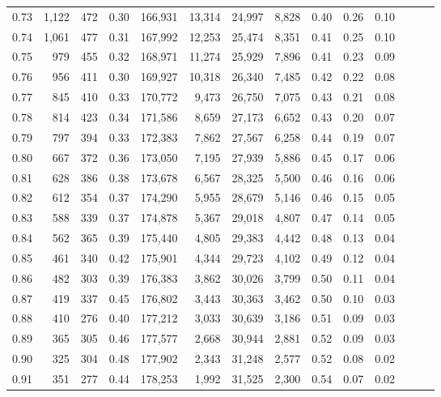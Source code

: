 \begin{tabular}{rrrrrrrrrrrrrr}
0.73 &  1,122 &  472 &  0.30 &  166,931 &   13,314 &  24,997 &   8,828 &  0.40 &  0.26 &      0.10 \\
0.74 &  1,061 &  477 &  0.31 &  167,992 &   12,253 &  25,474 &   8,351 &  0.41 &  0.25 &      0.10 \\
0.75 &    979 &  455 &  0.32 &  168,971 &   11,274 &  25,929 &   7,896 &  0.41 &  0.23 &      0.09 \\
0.76 &    956 &  411 &  0.30 &  169,927 &   10,318 &  26,340 &   7,485 &  0.42 &  0.22 &      0.08 \\
0.77 &    845 &  410 &  0.33 &  170,772 &    9,473 &  26,750 &   7,075 &  0.43 &  0.21 &      0.08 \\
0.78 &    814 &  423 &  0.34 &  171,586 &    8,659 &  27,173 &   6,652 &  0.43 &  0.20 &      0.07 \\
0.79 &    797 &  394 &  0.33 &  172,383 &    7,862 &  27,567 &   6,258 &  0.44 &  0.19 &      0.07 \\
0.80 &    667 &  372 &  0.36 &  173,050 &    7,195 &  27,939 &   5,886 &  0.45 &  0.17 &      0.06 \\
0.81 &    628 &  386 &  0.38 &  173,678 &    6,567 &  28,325 &   5,500 &  0.46 &  0.16 &      0.06 \\
0.82 &    612 &  354 &  0.37 &  174,290 &    5,955 &  28,679 &   5,146 &  0.46 &  0.15 &      0.05 \\
0.83 &    588 &  339 &  0.37 &  174,878 &    5,367 &  29,018 &   4,807 &  0.47 &  0.14 &      0.05 \\
0.84 &    562 &  365 &  0.39 &  175,440 &    4,805 &  29,383 &   4,442 &  0.48 &  0.13 &      0.04 \\
0.85 &    461 &  340 &  0.42 &  175,901 &    4,344 &  29,723 &   4,102 &  0.49 &  0.12 &      0.04 \\
0.86 &    482 &  303 &  0.39 &  176,383 &    3,862 &  30,026 &   3,799 &  0.50 &  0.11 &      0.04 \\
0.87 &    419 &  337 &  0.45 &  176,802 &    3,443 &  30,363 &   3,462 &  0.50 &  0.10 &      0.03 \\
0.88 &    410 &  276 &  0.40 &  177,212 &    3,033 &  30,639 &   3,186 &  0.51 &  0.09 &      0.03 \\
0.89 &    365 &  305 &  0.46 &  177,577 &    2,668 &  30,944 &   2,881 &  0.52 &  0.09 &      0.03 \\
0.90 &    325 &  304 &  0.48 &  177,902 &    2,343 &  31,248 &   2,577 &  0.52 &  0.08 &      0.02 \\
0.91 &    351 &  277 &  0.44 &  178,253 &    1,992 &  31,525 &   2,300 &  0.54 &  0.07 &      0.02 \\

\end{tabular}
